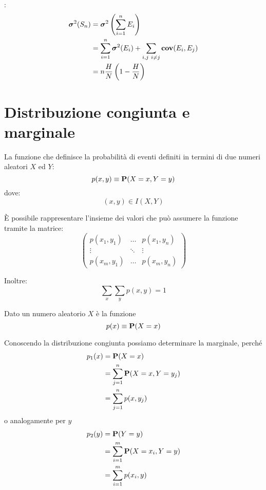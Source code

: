 :
\begin{align*}
  \var(S_n) &= \var \left(\sum_{i = 1}^n E_i\right) \\
  &= \sum_{i = 1}^n \var(E_i) + \sum_{i,j ~ i \neq j} \cov(E_i, E_j) \\ %
  &= n \frac{H}{N} \left( 1 - \frac{H}{N} \right)
\end{align*}

\section{Distribuzione congiunta e marginale} %
\begin{definition}
  \label{def:distribuzione_congiunta}
  La funzione che definisce la probabilità di eventi definiti in termini di due numeri aleatori \( X \) ed \( Y \):
  \[
    p(x,y) \equiv \mathbf{P}(X = x, Y = y)
  \]
  dove:
  \[
    (x,y) \in I(X,Y)
  \]
\end{definition}
È possibile rappresentare l'insieme dei valori che può assumere la funzione tramite la matrice:
\[
  \begin{pmatrix}
    p(x_1, y_1) & \dots & p(x_1, y_n) \\
    \vdots & \ddots & \vdots \\
    p(x_m, y_1) & \dots & p(x_m, y_n)
  \end{pmatrix}
\]

Inoltre:
\[
  \sum_x \sum_y p(x,y) = 1
\]

\begin{definition}
  \label{def:distribuzione_marginale}
  Dato un numero aleatorio \( X \) è la funzione
  \[
    p(x) \equiv \mathbf{P}(X = x)
  \]

  Conoscendo la distribuzione congiunta possiamo determinare la marginale, perché
  \begin{align*}
    p_1(x) &= \mathbf{P}(X = x) \\
    &= \sum_{j = 1}^n \mathbf{P}(X = x, Y = y_j) \\
    &= \sum_{j = 1}^n p(x, y_j)
  \end{align*}
  o analogamente per \( y \)
  \begin{align*}
    p_2(y) &= \mathbf{P}(Y = y) \\
    &= \sum_{i = 1}^m \mathbf{P}(X = x_i, Y = y) \\
    &= \sum_{i = 1}^m p(x_i, y)
  \end{align*}
\end{definition}


